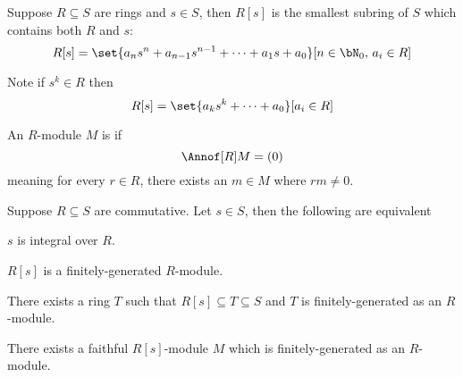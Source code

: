 \documentclass[10pt]{article}
\begin{document}


\bigskip

\begin{defn*}

    Suppose $R\subseteq S$ are rings and $s\in S$, then $R[s]$ is the smallest subring of $S$ which contains both $R$ and $s$:
    \[ R[s] = \set{a_ns^n+a_{n-1}s^{n-1}+\cdots+a_1s+a_0}[n\in\bN_0,\,a_i\in R] \]

\end{defn*}

Note if $s^k\in R$ then
\[ R[s] = \set{a_ks^k+\cdots+a_0}[a_i\in R] \]

\begin{defn*}

    An $R$-module $M$ is  if
    \[ \Annof[R]M = (0) \]
    meaning for every $r\in R$, there exists an $m\in M$ where $rm\neq0$.

\end{defn*}

\begin{prop*}

    Suppose $R\subseteq S$ are commutative.
    Let $s\in S$, then the following are equivalent
    \benum
        \item $s$ is integral over $R$.
        \item $R[s]$ is a finitely-generated $R$-module.
        \item There exists a ring $T$ such that $R[s]\subseteq T\subseteq S$ and $T$ is finitely-generated as an $R$-module.
        \item There exists a faithful $R[s]$-module $M$ which is finitely-generated as an $R$-module.
    \eenum

\end{prop*}
\end{document}
